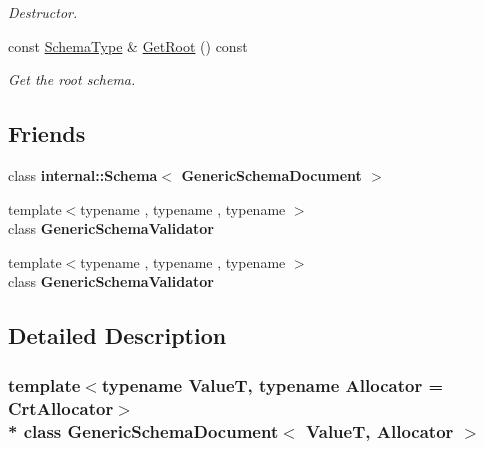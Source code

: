 \begin{DoxyCompactItemize}
\begin{DoxyCompactList}\small\item\em Destructor. \end{DoxyCompactList}\item 
const \hyperlink{classinternal_1_1_schema}{Schema\+Type} \& \hyperlink{class_generic_schema_document_a4975a5a422acfa221997046a7d28c344}{Get\+Root} () const \hypertarget{class_generic_schema_document_a4975a5a422acfa221997046a7d28c344}{}\label{class_generic_schema_document_a4975a5a422acfa221997046a7d28c344}

\begin{DoxyCompactList}\small\item\em Get the root schema. \end{DoxyCompactList}\end{DoxyCompactItemize}
\subsection*{Friends}
\begin{DoxyCompactItemize}
\item 
class {\bfseries internal\+::\+Schema$<$ Generic\+Schema\+Document $>$}\hypertarget{class_generic_schema_document_a706511849688d9245fc37109f02a03c4}{}\label{class_generic_schema_document_a706511849688d9245fc37109f02a03c4}

\item 
{\footnotesize template$<$typename , typename , typename $>$ }\\class {\bfseries Generic\+Schema\+Validator}\hypertarget{class_generic_schema_document_afcc03e6ba8f1a819e1a028c31ad38347}{}\label{class_generic_schema_document_afcc03e6ba8f1a819e1a028c31ad38347}

\item 
{\footnotesize template$<$typename , typename , typename $>$ }\\class {\bfseries Generic\+Schema\+Validator}\hypertarget{class_generic_schema_document_ad0d9afe88ab643028309569bbb827257}{}\label{class_generic_schema_document_ad0d9afe88ab643028309569bbb827257}

\end{DoxyCompactItemize}


\subsection{Detailed Description}
\subsubsection*{template$<$typename ValueT, typename Allocator = Crt\+Allocator$>$\\*
class Generic\+Schema\+Document$<$ Value\+T, Allocator $>$}

